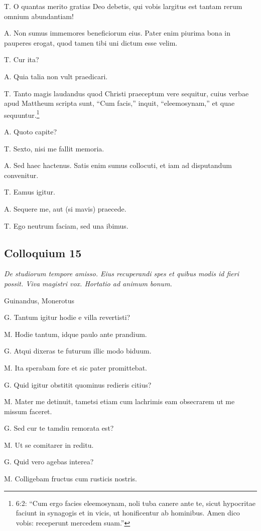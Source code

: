 \documentclass{article}
\begin{document}
T. O quantas merito gratias Deo debetis, qui vobis largitus est tantam rerum omnium abundantiam!

A. Non sumus immemores beneficiorum eius. Pater enim piurima bona in pauperes erogat, quod tamen tibi uni dictum esse velim.

T. Cur ita?

A. Quia talia non vult praedicari.

T. Tanto magis laudandus quod Christi praeceptum vere sequitur, cuius verbae apud Mattheum scripta sunt, ``Cum facis,'' inquit, ``eleemosynam,'' et quae sequuntur.\footnote{6:2: ``Cum ergo facies eleemosynam, noli tuba canere ante te, sicut hypocritae faciunt in synagogis et in vicis, ut honificentur ab hominibus. Amen dico vobis: receperunt mercedem suam.''}

A. Quoto capite?

T. Sexto, nisi me fallit memoria.

A. Sed haec hactenus. Satis enim sumus collocuti, et iam ad disputandum convenitur.

T. Eamus igitur.

A. Sequere me, aut (si mavis) praecede.

T. Ego neutrum faciam, sed una ibimus.
 
\subsection{Colloquium 15}
\emph{De studiorum tempore amisso. Eius recuperandi spes et quibus modis id fieri possit. Viva magistri vox. Hortatio ad animum bonum.}

Guinandus, Monerotus

G. Tantum igitur hodie e villa revertisti?

M. Hodie tantum, idque paulo ante prandium.

G. Atqui dixeras te futurum illic modo biduum.

M. Ita sperabam fore et sic pater promittebat.

G. Quid igitur obstitit quominus redieris citius?

M. Mater me detinuit, tametsi etiam cum lachrimis eam obsecrarem ut me missum faceret.

G. Sed cur te tamdiu remorata est?

M. Ut se comitarer in reditu.

G. Quid vero agebas interea?

M. Colligebam fructus cum rusticis nostris.
\end{document}
